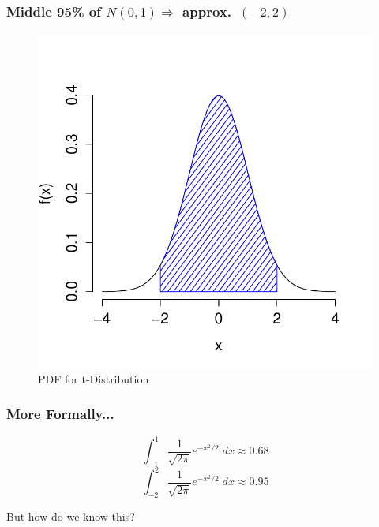 \documentclass[handout]{beamer}
\begin{document}
\begin{frame}
\frametitle{Middle 95\% of $N(0,1)\Rightarrow$ approx.\ $(-2,2)$}

\begin{figure}
\includegraphics[scale = 0.65]{./images/normal_middle95}
\caption{PDF for t-Distribution}
\end{figure}
\end{frame}
\begin{frame}
\frametitle{More Formally...}
$$\int_{-1}^1 \frac{1}{\sqrt{2\pi}} e^{-x^2/2}\; dx  \approx 0.68$$
\vspace{2em}
$$\int_{-2}^2 \frac{1}{\sqrt{2\pi}} e^{-x^2/2}\; dx  \approx 0.95$$
\begin{alertblock}{But how do we know this?}\end{alertblock}
\end{frame}
\end{document}
